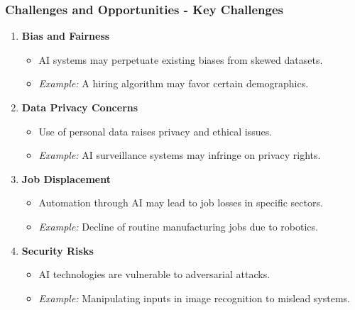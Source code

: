 \documentclass{beamer}
\begin{document}
\begin{frame}[fragile]
    \frametitle{Challenges and Opportunities - Key Challenges}
    \begin{enumerate}
        \item \textbf{Bias and Fairness}
            \begin{itemize}
                \item AI systems may perpetuate existing biases from skewed datasets. 
                \item \textit{Example:} A hiring algorithm may favor certain demographics.
            \end{itemize}
        
        \item \textbf{Data Privacy Concerns}
            \begin{itemize}
                \item Use of personal data raises privacy and ethical issues. 
                \item \textit{Example:} AI surveillance systems may infringe on privacy rights.
            \end{itemize}

        \item \textbf{Job Displacement}
            \begin{itemize}
                \item Automation through AI may lead to job losses in specific sectors.
                \item \textit{Example:} Decline of routine manufacturing jobs due to robotics.
            \end{itemize}

        \item \textbf{Security Risks}
            \begin{itemize}
                \item AI technologies are vulnerable to adversarial attacks.
                \item \textit{Example:} Manipulating inputs in image recognition to mislead systems.
            \end{itemize}
    \end{enumerate}
\end{frame}
\end{document}
